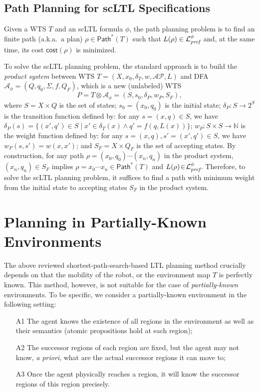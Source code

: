 \documentclass{ifacconf}
\def \AP{\mathcal{AP}}
\def \A{\mathcal{A}}
\def \L{\mathcal{L}}
\def \NN{\mathbb{N}}
\def \pref{\emph{\text{pref}}}
\def \path{\textsf{Path}}
\def \cost{\textsf{cost}}
\begin{document}
\subsection{Path Planning for scLTL Specifications}\label{subsec-product}
%
Given a WTS $T$ and an scLTL formula $\phi$, the path planning problem is to find an finite path (a.k.a.\ a plan) $\rho\in \path^*(T)$ such that 
$L(\rho) \in \L_\pref^\phi$ and, at the same time, its cost $\cost(\rho)$ is minimized.  

To solve the scLTL planning problem, the standard approach is to build the \emph{product system} between  WTS $T\!=\!(X,x_0,\delta_T,w,\AP,L)$ and DFA $\A_\phi\!=\!(Q,q_0,\Sigma,f,Q_F)$, which is a new (unlabeled) WTS
\[
P=T\otimes\A_\phi=(S,s_0,\delta_P,w_P,S_F), 
\]
where 
  $S\!=\!X\!\times\! Q$ is the set of states;
  $s_0\!=\!(x_0,q_0)$ is the initial state;
  $\delta_P\!:\!S \!\to\! 2^S$ is the transition function defined by:  
  for any $s\!=\!(x,q)\!\in\! S$,  we have
  $\delta_P(  s )\!=\!\{    (x',q')\!\in\! S \mid  x'\!\in\!\delta_T(x)\wedge q'\!=\! f(q,L(x)) \}$;
  $w_P\!:\! S\!\times\! S\!\to\!\NN$ is the weight function defined by: 
  for any $s\!=\!(x,q),s'\!=\!(x',q')\!\in\! S$, we have $w_P( s,s' )\!=\!w(x,x')$; and
  $S_F\!=\!X\times Q_F$ is the set of accepting states. 
By construction, 
for any path $\rho\!=\!(x_0,q_0)\cdots(x_n,q_n)$ in the product system,  
$(x_n,q_n)\!\in\! S_F$ implies  $\rho\!=\!x_0\cdots x_n\!\in\! \path^*(T)$  and  $L(\rho)\!\in\! \L_{\pref}^\phi$. 
Therefore, to solve the scLTL planning  problem, it suffices to find a path with minimum weight from the initial state to accepting states $S_F$ in the product system.  
 

\section{Planning in Partially-Known Environments}\label{sec:parti}
%
The above reviewed shortest-path-search-based LTL planning method crucially  depends on that the mobility of the robot, or the environment map $T$ is perfectly known. This method, however, is not suitable for the case of  \emph{partially-known} environments. 
To be specific,  we consider a partially-known environment in the following setting:
\begin{itemize}
    \item[A1] 
    The agent knows the existence of all regions in the environment as well as their semantics (atomic propositions hold at each region); 
    \item[A2] 
    The successor regions of each region are fixed, but the agent may not know, \emph{a priori}, what are the actual successor regions it can move to;
    \item[A3]
    Once the agent physically reaches a region, it will know the successor regions of this region precisely.  
\end{itemize}
\end{document}
